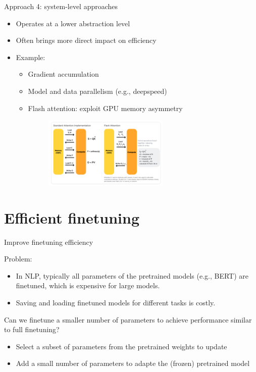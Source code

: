 \documentclass[usenames,dvipsnames,notes,11pt,aspectratio=169,hyperref={colorlinks=true, linkcolor=blue}]{beamer}
\begin{document}
\begin{frame}
    {Approach 4: system-level approaches}
    \begin{itemize}
        \item Operates at a lower abstraction level
        \item Often brings more direct impact on efficiency
        \item Example:
            \begin{itemize}
                \item Gradient accumulation
                \item Model and data parallelism (e.g., deepspeed)
                \item Flash attention: exploit GPU memory asymmetry
                    \begin{figure}
    \includegraphics[width=0.6\textwidth]{figures/flash-attention}\\
                    \end{figure}
            \end{itemize}
    \end{itemize}
\end{frame}

\section{Efficient finetuning}

\begin{frame}
    {Improve finetuning efficiency}

    Problem:\\
    \begin{itemize}
        \item In NLP, typically all parameters of the pretrained models (e.g., BERT) are finetuned, which is expensive for large models.
        \item Saving and loading finetuned models for different tasks is costly.
    \end{itemize}
    \pause

    Can we finetune a smaller number of parameters to achieve performance similar to full finetuning?\\\pause
    \begin{itemize}
        \item Select a subset of parameters from the pretrained weights to update 
        \item Add a small number of parameters to adapte the (frozen) pretrained model
    \end{itemize}
\end{frame}
\end{document}
